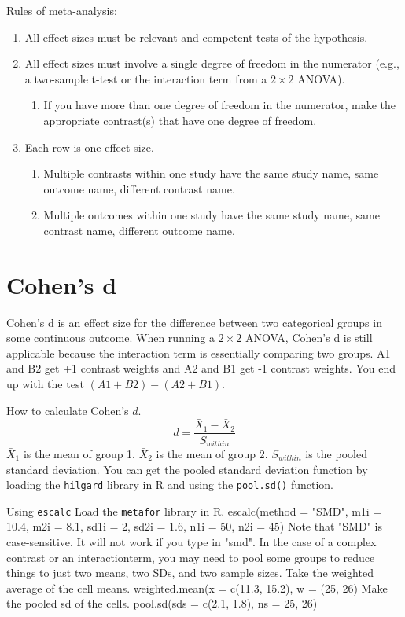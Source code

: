 \documentclass{article}
\begin{document}
\maketitle

\begin{center}
Rules of meta-analysis:
\end{center}

\begin{enumerate}
\item All effect sizes must be relevant and competent tests of the hypothesis.
\item All effect sizes must involve a single degree of freedom in the numerator (e.g., a two-sample t-test or the interaction term from a $2\times2$ ANOVA).
	\begin{enumerate}
	\item If you have more than one degree of freedom in the numerator, make the appropriate contrast(s) that have one degree of freedom.
	\end{enumerate}
\item Each row is one effect size.
	\begin{enumerate}
	\item Multiple contrasts within one study have the same study name, same outcome name, different contrast name.
	\item Multiple outcomes within one study have the same study name, same contrast name, different outcome name.
	\end{enumerate}
\end{enumerate}

\section{Cohen's d}
Cohen's d is an effect size for the difference between two categorical groups in some continuous outcome.
When running a $2\times2$ ANOVA, Cohen's d is still applicable because the interaction term is essentially comparing two groups. A1 and B2 get +1 contrast weights and A2 and B1 get -1 contrast weights. You end up with the test $(A1 + B2) - (A2 + B1)$.

How to calculate Cohen's $d$.
\begin{equation}
d = \frac{\bar{X}_{1} - \bar{X}_{2}}{S_{within}}
\end{equation}
$\bar{X}_{1}$ is the mean of group 1. $\bar{X}_{2}$ is the mean of group 2. $S_{within}$ is the pooled standard deviation. You can get the pooled standard deviation function by loading the {\tt hilgard} library in R and using the {\tt pool.sd()} function.


Using {\tt escalc}
Load the {\tt metafor} library in R.
escalc(method = "SMD", m1i = 10.4, m2i = 8.1, sd1i = 2, sd2i = 1.6, n1i = 50, n2i = 45)
Note that "SMD" is case-sensitive. It will not work if you type in "smd".
In the case of a complex contrast or an interactionterm, you may need to pool some groups to reduce things to just two means, two SDs, and two sample sizes.
Take the weighted average of the cell means.
weighted.mean(x = c(11.3, 15.2), w = (25, 26)
Make the pooled sd of the cells.
pool.sd(sds = c(2.1, 1.8), ns = 25, 26)
\end{document}

